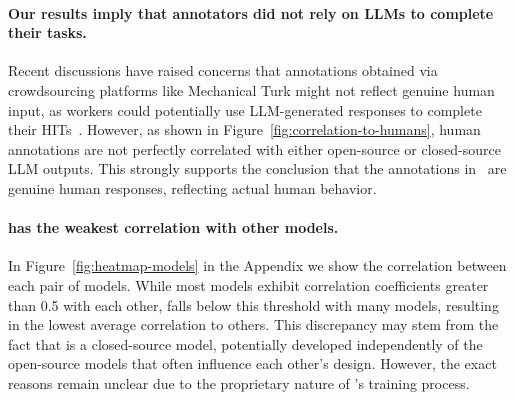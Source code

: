 

\paragraph{Our results imply that annotators did not rely on LLMs to complete their tasks.} Recent discussions have raised concerns that annotations obtained via crowdsourcing platforms like Mechanical Turk might not reflect genuine human input, as workers could potentially use LLM-generated responses to complete their HITs~\cite{veselovsky2023artificial}. However, as shown in Figure~\ref{fig:correlation-to-humans}, human annotations are not perfectly correlated with either open-source or closed-source LLM outputs. This strongly supports the conclusion that the annotations in~\name{} are genuine human responses, reflecting actual human behavior.

\paragraph{\gpt{} has the weakest correlation with other models.}
In Figure~\ref{fig:heatmap-models} in the Appendix we show the correlation between each pair of models. While most models exhibit correlation coefficients greater than 0.5 with each other, \gpt{} falls below this threshold with many models, resulting in the lowest average correlation to others. This discrepancy may stem from the fact that \gpt{} is a closed-source model, potentially developed independently of the open-source models that often influence each other’s design. However, the exact reasons remain unclear due to the proprietary nature of \gpt{}'s training process. 




